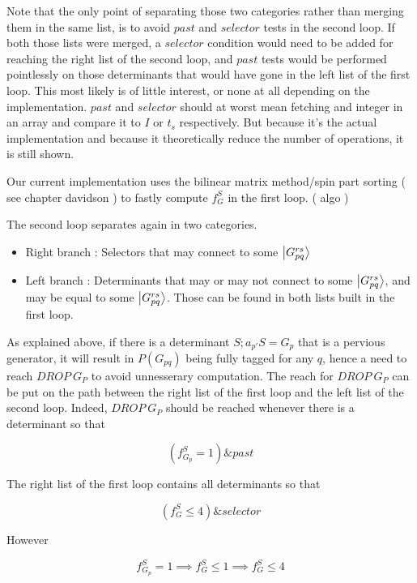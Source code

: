 \documentclass[./thesis.tex]{subfiles}
\begin{document}
Note that the only point of separating those two categories rather than merging them in the same list, is to avoid $past$ and $selector$ tests in the second loop. If both those lists were merged, a $selector$ condition would need to be added for reaching the right list of the second loop, and $past$ tests would be performed pointlessly on those determinants that would have gone in the left list of the first loop.
This most likely is of little interest, or none at all depending on the implementation. $past$ and $selector$ should at worst mean fetching and integer in an array and compare it to $I$ or $t_s$ respectively. But because it's the actual implementation and because it theoretically reduce the number of operations, it is still shown.

Our current implementation uses the bilinear matrix method/spin part sorting ( see chapter davidson ) to fastly compute $f_G^S$ in the first loop. ( algo )


The second loop separates again in two categories.

\begin{itemize}
\item
Right branch : Selectors that may connect to some $\ket {G_{pq}^{rs}}$
\item
Left branch : Determinants that may or may not connect to some $\ket {G_{pq}^{rs}}$, and may be equal to some $\ket {G_{pq}^{rs}}$. Those can be found in both lists built in the first loop.
\end{itemize}

As explained above, if there is a determinant $S ; a_{p'}S = G_{p}$ that is a pervious generator, it will result in $P(G_{pq})$ being fully tagged for any $q$, hence a need to reach $DROP\ G_P$ to avoid unnesserary computation.
The reach for $DROP\ G_P$ can be put on the path between the right list of the first loop and the left list of the second loop.
Indeed, $DROP\ G_P$ should be reached whenever there is a determinant so that


\begin{equation}
(f^S_{G_{p}} = 1) \& past
\end{equation}


The right list of the first loop contains all determinants so that


\begin{equation}
(f^S_G \leq 4) \& selector
\end{equation}


However 


\begin{equation}
f^S_{G_{p}} = 1 \implies f^S_G \leq 1 \implies f^S_G \leq 4
\end{equation}
\end{document}
